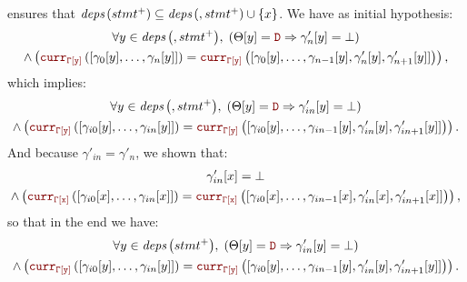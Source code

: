 \begin{skippableproof}
\begin{itemize}
               ensures that
              ${\textit{deps}\left(stmt^+\right)} \subseteq {\ensuremath{\textit{deps}\left(, stmt^+\right)}} \cup \{x\}$. We have as initial
              hypothesis:
              \begin{multline*}
                  \forall y \in \depSet{, stmt^+}, \; \left(\Theta[y] = \dType \Rightarrow \gamma'_n[y] = \bot\right) \\
                  \wedge \left(\CurrVal{\tyCtx[y]}{[\gamma_0[y], \dots, \gamma_n[y]]} = \CurrVal{\tyCtx[y]}{[\gamma_0[y], \dots, \gamma_{n-1}[y], \gamma'_n[y], \gamma'_{n+1}[y]]}\right),
              \end{multline*}
              which implies:
              \begin{multline*}
                  \forall y \in \depSet{, stmt^+}, \; \left(\Theta[y] = \dType \Rightarrow \gamma'_{in}[y] = \bot\right) \\
                  \wedge \left(\CurrVal{\tyCtx[y]}{[\gamma_{i0}[y], \dots, \gamma_{in}[y]]} = \CurrVal{\tyCtx[y]}{[\gamma_{i0}[y], \dots, \gamma_{in-1}[y], \gamma'_{in}[y], \gamma'_{in+1}[y]]}\right).
              \end{multline*}
              And because $\gamma'_{in} = \gamma'_n$, we shown that:
              \begin{multline*}
                  \gamma'_{in}[x] = \bot \\
                  \wedge \left(\CurrVal{\tyCtx[x]}{[\gamma_{i0}[x], \dots, \gamma_{in}[x]]} = \CurrVal{\tyCtx[x]}{[\gamma_{i0}[x], \dots, \gamma_{in-1}[x], \gamma'_{in}[x], \gamma'_{in+1}[x]]}\right),
              \end{multline*}
              so that in the end we have:
              \begin{multline*}
                  \forall y \in \depSet{stmt^+}, \; \left(\Theta[y] = \dType \Rightarrow \gamma'_{in}[y] = \bot\right) \\
                  \wedge \left(\CurrVal{\tyCtx[y]}{[\gamma_{i0}[y], \dots, \gamma_{in}[y]]} = \CurrVal{\tyCtx[y]}{[\gamma_{i0}[y], \dots, \gamma_{in-1}[y], \gamma'_{in}[y], \gamma'_{in+1}[y]]}\right).
              \end{multline*}


\end{itemize}
\end{skippableproof}
